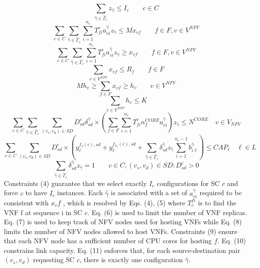 \documentclass[12pt]{article}
\begin{document}
\begin{equation} 
\sum_{\hat{\gamma}\in \hat{\Gamma}_c}z_{{\hat{\gamma}}}\leq I_c \quad \quad c\in C
\end{equation}
\begin{equation}
\sum_{c \in C}\sum_{\hat{\gamma}\in \hat{\Gamma}_c}\sum_{i=1}^{n_c}T_{fi}^{c}a_{vi}^{\hat{\gamma}}z_{{\hat{\gamma}}}\leq Mx_{vf} \quad \quad f\in F, v\in V^{NFV}
\end{equation}
\begin{equation}
\sum_{c \in C}\sum_{\hat{\gamma}\in \hat{\Gamma}_c}\sum_{i=1}^{n_c}T_{fi}^{c}a_{vi}^{\hat{\gamma}}z_{{\hat{\gamma}}}\geq x_{vf}\quad \quad f\in F, v\in V^{NFV}
\end{equation}
\begin{equation}
\sum_{v \in V^{NFV}} x_{vf}\leq R_{f} \quad \quad f\in F
\end{equation}
\begin{equation}
Mh_v \geq \sum_{f \in F} x_{vf}\geq h_{v} \quad \quad  v\in V^{NFV}
\end{equation}
\begin{equation}
\sum_{v \in V^{NFV}} h_v \leq K
\end{equation}
\begin{equation}
\sum_{c \in C}\sum_{\hat{\gamma}\in \hat{\Gamma}_c}\sum_{(v_s, v_d)\in SD} D^{c}_{sd}\delta_{sd}^{\hat{\gamma}}\times (\sum_{f \in F}\sum_{i=1}^{n_c}T_{fi}^{c}n_{f}^{CORE}a_{vi}^{\hat{\gamma}})z_{\hat{\gamma}}\leq N^{CORE} \quad v\in V_{NFV}
\end{equation}
\begin{equation}
\sum_{c \in C}\sum_{(v_s, v_d)\in SD} D^{c}_{sd}\times (y_{\ell}^{f_{1} (c),sd}+y_{\ell}^{f_{n_c} (c),sd}+\sum_{\hat{\gamma}\in \hat{\Gamma}_c}\delta_{sd}^{\hat{\gamma}}z_{\hat{\gamma}}\sum_{i=1}^{n_c -1}b_{i\ell}^{\hat{\gamma}}) \leq CAP_{\ell} \quad \ell \in L
\end{equation}
\begin{equation}
\sum_{\hat{\gamma}\in \hat{\Gamma}_c}\delta_{sd}^{\hat{\gamma}}z_{\hat{\gamma}}=1\quad \quad c\in C, (v_s,v_d)\in SD : D_{sd}^{c}>0
\end{equation}
Constraints (4) guarantee that we select exactly $I_c$ configurations for SC $c$ and force $c$ to have $I_c$ instances. Each $\hat{\gamma}$ is associated with a set of $a_{vi}^{\hat{\gamma}}$ required to be consistent with $x_vf$ , which is resolved by Eqs. (4), (5) where $T_{c}^{fi}$ is to find the VNF f at sequence i in SC $c$. Eq. (6) is used to limit the number of VNF replicas. Eq. (7) is used to keep track of NFV nodes used for hosting VNFs while Eq. (8) limits the number of NFV nodes allowed to host VNFs. Constraints (9) ensure that each NFV node has a sufficient number of CPU cores for hosting $f$. Eq. (10) constrains link capacity. Eq. (11) enforces that, for each source-destination pair $(v_s, v_d)$ requesting SC $c$, there is exactly one configuration $\hat{\gamma}$.
\end{document}
